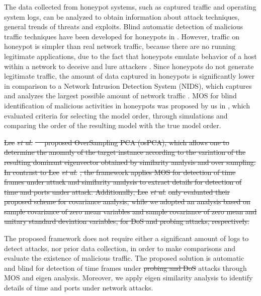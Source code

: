 \documentclass[review]{elsarticle}
\providecommand{\DIFaddtex}[1]{{\protect\color{blue}\uwave{#1}}} %
\providecommand{\DIFdeltex}[1]{{\protect\color{red}\sout{#1}}}                      %
\providecommand{\DIFaddbegin}{} %
\providecommand{\DIFaddend}{} %
\providecommand{\DIFdelbegin}{} %
\providecommand{\DIFdelend}{} %
\providecommand{\DIFadd}[1]{\texorpdfstring{\DIFaddtex{#1}}{#1}} %
\providecommand{\DIFdel}[1]{\texorpdfstring{\DIFdeltex{#1}}{}} %
\begin{document}
The data collected from honeypot systems, such as captured traffic and operating system logs, can be analyzed to obtain information about attack techniques, general trends of threats and exploits. Blind automatic detection of malicious traffic techniques have been developed for honeypots in \cite{david2011blind,da2012improved}. However, traffic on honeypot is simpler than real network traffic, because there are no running legitimate applications, due to the fact that honeypots emulate behavior of a host within a network to deceive and lure attackers \cite{zakaria2012review}. Since honeypots do not generate legitimate traffic, the amount of data captured in honeypots is significantly lower in comparison to a Network Intrusion Detection System (NIDS), which captures and analyzes the largest possible amount of network traffic \cite{david2011blind}. MOS for blind identification of malicious activities in honeypots was proposed by us in \cite{david2011blind}, which evaluated criteria for selecting the model order, through simulations and comparing the order of the resulting model with the true model order.

\DIFdelbegin \DIFdel{Lee }\emph{\DIFdel{et al.}} %
\DIFdel{\mbox{%
\cite{Lee2013}
}%
proposed OverSampling PCA (osPCA), which allows one to determine the anomaly of the target instance according to the variation of the resulting dominant eigenvector obtained by similarity analysis and over sampling. In contrast to Lee }\emph{\DIFdel{et al.}}%
\DIFdel{, the framework applies MOS for detection of time frames under attack and similarity analysis to extract details for detection of time and ports under attack. Additionally, Lee }\emph{\DIFdel{et al.}} %
\DIFdel{only evaluated their proposed scheme for covariance analysis, while we adopted an analysis based on sample covariance of zero mean variables and sample covariance of zero mean and unitary standard deviation variables, for DoS and probing attacks, respectively.
}%

\DIFdelend The proposed framework does not require either a significant amount of logs to detect attacks, nor prior data collection, in order to make comparisons and evaluate the existence of malicious traffic. The proposed solution is automatic and blind for detection of time frames under \DIFdelbegin \DIFdel{probing and DoS }\DIFdelend \DIFaddbegin \DIFadd{probe and flood }\DIFaddend attacks through MOS and eigen analysis. Moreover, we apply eigen similarity analysis to identify details of time and ports under network attacks.
\end{document}
